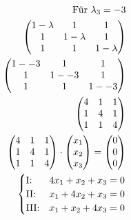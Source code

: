 \begin{align*}
    \text{Für } \lambda_3 = -3                         \\
    \begin{pmatrix}
        1 - \lambda & 1           & 1           \\
        1           & 1 - \lambda & 1           \\
        1           & 1           & 1 - \lambda
    \end{pmatrix}            \\
    \begin{pmatrix}
        1 - -3 & 1      & 1      \\
        1      & 1 - -3 & 1      \\
        1      & 1      & 1 - -3
    \end{pmatrix}                           \\
    \begin{pmatrix}
        4 & 1 & 1 \\
        1 & 4 & 1 \\
        1 & 1 & 4
    \end{pmatrix}                                     \\
    \begin{pmatrix}
        4 & 1 & 1 \\
        1 & 4 & 1 \\
        1 & 1 & 4
    \end{pmatrix} \cdot \begin{pmatrix}
                            x_1 \\ x_2 \\ x_3
                        \end{pmatrix} = \begin{pmatrix}
                                            0 \\ 0 \\ 0
                                        \end{pmatrix} \\
    \begin{cases}
        \text{I:\@}   & 4x_1 + x_2 + x_3 = 0 \\
        \text{II:\@}  & x_1 + 4x_2 + x_3 = 0 \\
        \text{III:\@} & x_1 + x_2 + 4x_3 = 0
    \end{cases}
\end{align*}

